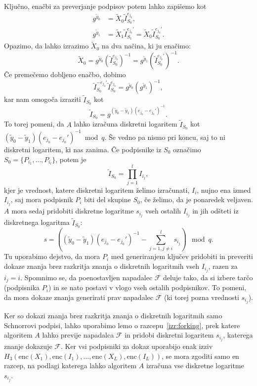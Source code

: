 \begin{dokaz}
Ključno, enačbi za preverjanje podpisov potem lahko zapišemo kot
\begin{align*}
    g^{\tilde{y}_0} &= \tilde{X}_0 \tilde{I}_{S_0}^{e_{j_0}}, \\
    g^{\tilde{y}_1} &= \tilde{X}_1 \tilde{I}_{S_1}^{e_{j_0}'}
        = \tilde{X}_0 \tilde{I}_{S_0}^{e_{j_0}'}.
\end{align*}
Opazimo, da lahko izrazimo $\tilde{X}_0$ na dva načina, ki ju enačimo:
$$
\tilde{X}_0 = g^{\tilde{y}_0}(\tilde{I}_{S_0}^{e_{j_0}})^{-1}
    = g^{\tilde{y}_1}(\tilde{I}_{S_0}^{e_{j_0}'})^{-1}.
$$
Če premečemo dobljeno enačbo, dobimo
$$
\tilde{I}_{S_0}^{- e_{j_0}'} \tilde{I}_{S_0}^{e_{j_0}} = g^{\tilde{y}_0}(g^{\tilde{y}_1})^{-1},
$$
kar nam omogoča izraziti $\tilde{I}_{S_0}$ kot
$$
\tilde{I}_{S_0} = g^{(\tilde{y}_0 - \tilde{y}_1) (e_{j_0} - e_{j_0}')^{-1}}.
$$
To torej pomeni, da $A$ lahko izračuna diskretni logaritem $\tilde{I}_{S_0}$ kot
$(\tilde{y}_0 - \tilde{y}_1) (e_{j_0} - e_{j_0}')^{-1} \bmod q$. Še vedno pa nismo pri koncu, saj to ni
diskretni logaritem, ki nas zanima. Če podpisnike iz $S_0$ označimo $S_0 = \{P_{i_1}, \dots, P_{i_l}\}$,
potem je 
$$
\tilde{I}_{S_0} = \prod_{j=1}^l I_{i_j},
$$
kjer je vrednost, katere diskretni logaritem želimo izračunati, $I_i$, nujno ena izmed $I_{i_j}$,
saj mora podpisnik $P_i$ biti del skupine $S_0$, če želimo, da je ponaredek veljaven. $A$ mora sedaj
pridobiti diskretne logaritme $s_{i_j}$ vseh ostalih $I_{i_j}$ in jih odšteti iz diskretnega logaritma
$\tilde{I}_{S_0}$:
$$
s = \left( (\tilde{y}_0 - \tilde{y}_1) (e_{j_0} - e_{j_0}')^{-1} - \sum_{j=1, j \ne i}^l s_{i_j} \right) \mod q.
$$
Tu uporabimo dejstvo, da mora $P_i$ med generiranjem ključev pridobiti in preveriti
dokaze znanja brez razkritja znanja o diskretnih logaritmih vseh $I_{i_j}$, razen za $i_j = i$.
Spomnimo se, da poenostavljen napadalec $\mathcal{F}$ deluje tako, da si izbere tarčo (podpisnika $P_i$)
in se nato postavi v vlogo vseh ostalih podpisnikov. To pomeni, da mora dokaze znanja generirati
prav napadalec $\mathcal{F}$ (ki torej pozna vrednosti $s_{i_j}$).

Ker so dokazi znanja brez razkritja znanja o diskretnih logaritmih samo Schnorrovi podpisi, lahko
uporabimo lemo o razcepu~\ref{izr:forking}, prek katere algoritem $A$ lahko previje napadalca
$\mathcal{F}$ in pridobi diskretni logaritem $s_{i_j}$, katerega znanje dokazuje $\mathcal{F}$.
Ker vsi podpisniki za dokaz uporabijo enak izziv $H_3(\text{enc}(X_1), \text{enc}(I_1), \dots,
\text{enc}(X_L), \allowbreak \text{enc}(I_L))$, se mora zgoditi samo en razcep, na podlagi katerega
lahko algoritem $A$ izračuna vse diskretne logaritme $s_{i_j}$.


\end{dokaz}
